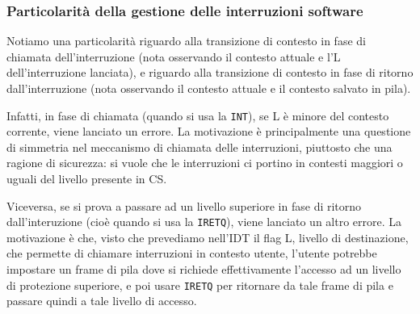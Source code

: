 \documentclass[a4paper,11pt]{article}
\begin{document}
\subsubsection{Particolarità della gestione delle interruzioni software}
Notiamo una particolarità riguardo alla transizione di contesto in fase di chiamata dell'interruzione (nota osservando il contesto attuale e l'L dell'interruzione lanciata), e riguardo alla transizione di contesto in fase di ritorno dall'interruzione (nota osservando il contesto attuale e il contesto salvato in pila).

Infatti, in fase di chiamata (quando si usa la \lstinline|INT|), se L è minore del contesto corrente, viene lanciato un errore.
La motivazione è principalmente una questione di simmetria nel meccanismo di chiamata delle interruzioni, piuttosto che una ragione di sicurezza: si vuole che le interruzioni ci portino in contesti maggiori o uguali del livello presente in CS.

Viceversa, se si prova a passare ad un livello superiore in fase di ritorno dall'interuzione (cioè quando si usa la \lstinline|IRETQ|), viene lanciato un altro errore.
La motivazione è che, visto che prevediamo nell'IDT il flag L, livello di destinazione, che permette di chiamare interruzioni in contesto utente, l'utente potrebbe impostare un frame di pila dove si richiede effettivamente l'accesso ad un livello di protezione superiore, e poi usare \lstinline|IRETQ| per ritornare da tale frame di pila e passare quindi a tale livello di accesso.
\end{document}
